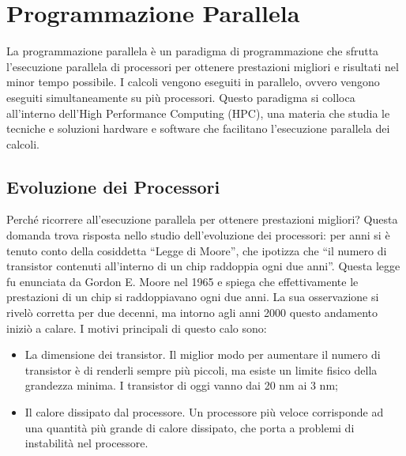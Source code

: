 \documentclass[12pt,a4paper,openright,twoside]{report}
\begin{document}
\rhead[\fancyplain{}{\bfseries\leftmark}]{\fancyplain{}{\bfseries\thepage}}
\clearpage{\pagestyle{empty}\cleardoublepage}
\clearpage{\pagestyle{empty}\cleardoublepage}
\chapter{Programmazione Parallela}

\lhead[\fancyplain{}{\bfseries\thepage}]{\fancyplain{}{\bfseries\rightmark}}

La programmazione parallela è un paradigma di programmazione che sfrutta l'esecuzione parallela di processori per ottenere prestazioni migliori e risultati nel minor tempo possibile. I calcoli vengono eseguiti in parallelo, ovvero vengono eseguiti simultaneamente su più processori. Questo paradigma si colloca all'interno dell'High Performance Computing (HPC), una materia che studia le tecniche e soluzioni hardware e software che facilitano l'esecuzione parallela dei calcoli.



\section{Evoluzione dei Processori}

Perché ricorrere all'esecuzione parallela per ottenere prestazioni migliori? Questa domanda trova risposta nello studio dell'evoluzione dei processori: per anni si è tenuto conto della cosiddetta ``Legge di Moore'', che ipotizza che ``il numero di transistor contenuti all'interno di un chip raddoppia ogni due anni''. Questa legge fu enunciata da Gordon E. Moore nel 1965 e spiega che effettivamente le prestazioni di un chip si raddoppiavano ogni due anni. La sua osservazione si rivelò corretta per due decenni, ma intorno agli anni 2000 questo andamento iniziò a calare. I motivi principali di questo calo sono:

\begin{itemize}
    \item La dimensione dei transistor. Il miglior modo per aumentare il numero di transistor è di renderli sempre più piccoli, ma esiste un limite fisico della grandezza minima. I transistor di oggi vanno dai 20 nm ai 3 nm;
    \item Il calore dissipato dal processore. Un processore più veloce corrisponde ad una quantità più grande di calore dissipato, che porta a problemi di instabilità nel processore.
\end{itemize}
\end{document}
